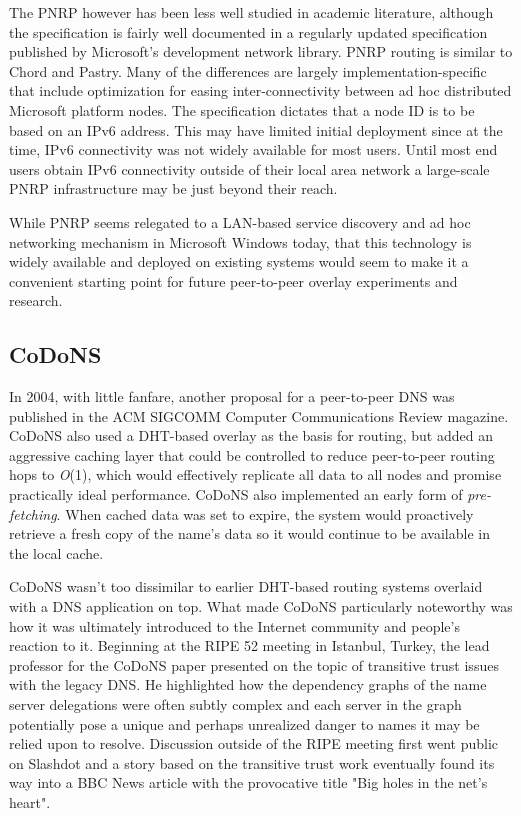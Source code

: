 \documentclass[sigconf]{acmart}
\begin{document}
The PNRP however has been less well studied in academic literature,
although the specification is fairly well documented in a regularly
updated specification published by Microsoft's development network
library.\cite{microsoft_peer_2017}  PNRP routing is similar to Chord and
Pastry.  Many of the differences are largely implementation-specific
that include optimization for easing inter-connectivity between ad hoc
distributed Microsoft platform nodes.  The specification dictates that a
node ID is to be based on an IPv6 address.  This may have limited
initial deployment since at the time, IPv6 connectivity was not widely
available for most users.  Until most end users obtain IPv6 connectivity
outside of their local area network a large-scale PNRP infrastructure
may be just beyond their reach.

While PNRP seems relegated to a LAN-based service discovery and ad hoc
networking mechanism in Microsoft Windows today, that this technology is
widely available and deployed on existing systems would seem to make it
a convenient starting point for future peer-to-peer overlay experiments
and research.

\subsection{CoDoNS}

In 2004, with little fanfare, another proposal for a peer-to-peer DNS
was published in the ACM SIGCOMM Computer Communications Review
magazine.\cite{ramasubramanian_design_2004}  CoDoNS also used a
DHT-based overlay as the basis for routing, but added an aggressive
caching layer that could be controlled to reduce peer-to-peer routing
hops to \emph{O}(1), which would effectively replicate all data to all
nodes and promise practically ideal performance.  CoDoNS also
implemented an early form of \emph{pre-fetching}.  When cached data
was set to expire, the system would proactively retrieve a fresh copy of
the name's data so it would continue to be available in the local cache.

CoDoNS wasn't too dissimilar to earlier DHT-based routing systems
overlaid with a DNS application on top.  What made CoDoNS particularly
noteworthy was how it was ultimately introduced to the Internet
community and people's reaction to it.  Beginning at the RIPE 52 meeting
in Istanbul, Turkey, the lead professor for the CoDoNS paper
presented on the topic of transitive trust issues with the legacy DNS.
He highlighted how the dependency graphs of the name server delegations
were often subtly complex and each server in the graph potentially
pose a unique and perhaps unrealized danger to names it may be relied
upon to resolve.  Discussion outside of the RIPE meeting first went
public on Slashdot and a story based on the transitive trust work
eventually found its way into a BBC News article with the provocative
title "Big holes in the net's
heart".\cite{cmdrtaco_perils_2006}\cite{ward_big_2006}
\end{document}

